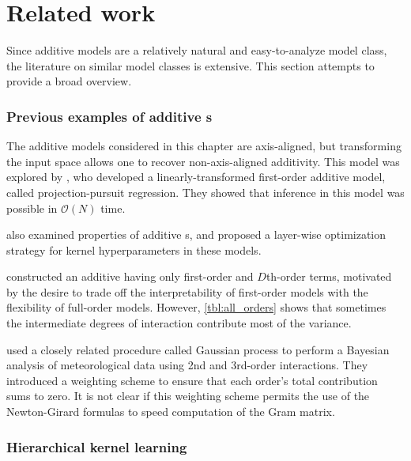 \section{Related work}

Since additive models are a relatively natural and easy-to-analyze model class, the literature on similar model classes is extensive.
This section attempts to provide a broad overview.

\subsubsection{Previous examples of additive \sgp{}s}

The additive models considered in this chapter are axis-aligned, but transforming the input space allows one to recover non-axis-aligned additivity.
This model was explored by \citet{gilboa2013scaling}, who developed a linearly-transformed first-order additive \gp{} model, called projection-pursuit \gp{} regression.
They showed that inference in this model was possible in $\mathcal{O}(N)$ time.

\citet{durrande2011additive} also examined properties of additive \gp{}s, and proposed a layer-wise optimization strategy for kernel hyperparameters in these models.

\citet{plate1999accuracy} constructed an additive \gp{} having only first-order and $D$th-order terms, motivated by the desire to trade off the interpretability of first-order models with the flexibility of full-order models.
However, \cref{tbl:all_orders} shows that sometimes the intermediate degrees of interaction contribute most of the variance.

\citet{kaufman2010bayesian} used a closely related procedure called Gaussian process \ANOVA{} to perform a Bayesian analysis of meteorological data using 2nd and 3rd-order interactions.
They introduced a weighting scheme to ensure that each order's total contribution sums to zero.
It is not clear if this weighting scheme permits the use of the Newton-Girard formulas to speed computation of the Gram matrix.


\subsubsection{Hierarchical kernel learning}

